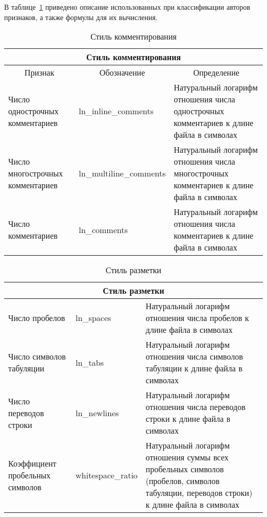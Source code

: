 В таблице~\ref{tab:1} приведено описание использованных при классификации авторов 
признаков, а также формулы для их вычисления.

\begin{table}[h!]
\caption{ Стиль комментирования }
\label{tab:1}
\begin{center}
\begin{tabularx}{\linewidth}{|X|X|X|}
\hline
\multicolumn{3}{|c|}{Стиль комментирования} \\
\hline
\multicolumn{1}{|c|}{Признак} & \multicolumn{1}{|c|}{Обозначение} & \multicolumn{1}{|c|}{Определение} \\
\hline
Число однострочных комментариев & ln\_inline\_comments & Натуральный логарифм отношения числа однострочных комментариев к длине файла в символах \\
\hline
Число многострочных комментариев & ln\_multiline\_comments & Натуральный логарифм отношения числа многострочных комментариев к длине файла в символах \\
\hline
Число комментариев & ln\_comments & Натуральный логарифм отношения числа комментариев к длине файла в символах \\
\hline
\end{tabularx}
\end{center}
\end{table}


\begin{table}[ht]
\caption{ Стиль разметки }
\label{tab:3}
\begin{center}
\begin{tabularx}{\linewidth}{|X|X|X|}
\hline
\multicolumn{3}{|c|}{Стиль разметки} \\
\hline
Число пробелов & ln\_spaces & Натуральный логарифм отношения числа пробелов к длине файла в символах \\
\hline
Число символов табуляции & ln\_tabs & Натуральный логарифм отношения числа символов табуляции к длине файла в символах \\
\hline
Число переводов строки & ln\_newlines & Натуральный логарифм отношения числа переводов строки к длине файла в символах \\
\hline
Коэффициент пробельных символов & whitespace\_ratio & Натуральный логарифм отношения суммы всех пробельных символов (пробелов, символов табуляции, переводов строки) к длине файла в символах \\
\hline
\end{tabularx}
\end{center}
\end{table}


